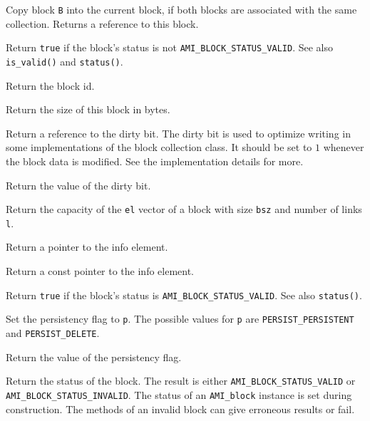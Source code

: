          {Copy
        block \lstinline|B| into the current block, if both blocks are associated
        with the same collection. Returns a reference to this block.}

         {Return \lstinline|true| if the block's status 
        is not \lstinline|AMI_BLOCK_STATUS_VALID|. See also \lstinline|is_valid()| and 
        \lstinline|status()|.}

         {Return the block id.}

         {Return the size of this block
        in bytes.}

         {Return a reference to the dirty bit. The
        dirty bit is used to optimize writing in some implementations of
        the block collection class. It should be set to $1$ whenever the
        block data is modified. See the implementation details for more.}

         {Return the value of the dirty bit.}

        {Return the capacity of the \lstinline|el| vector of a block with size 
        \lstinline|bsz| and number of links \lstinline|l|.}

         {Return a pointer to the info element.}
        
         {Return a const pointer to the 
        info element.}

         {Return \lstinline|true| if the block's 
        status is \lstinline|AMI_BLOCK_STATUS_VALID|. See also \lstinline|status()|.}

         {Set the persistency flag to
        \lstinline|p|. The possible values for \lstinline|p| are \lstinline|PERSIST_PERSISTENT| and \lstinline|PERSIST_DELETE|.}

         {Return the value of the 
        persistency flag.} 

         {Return the status of the
        block. The result is either
        \lstinline|AMI_BLOCK_STATUS_VALID| or 
      \lstinline|AMI_BLOCK_STATUS_INVALID|. The status of an \lstinline|AMI_block|
        instance is set during construction. The methods of an invalid
        block can give erroneous results or fail.}

